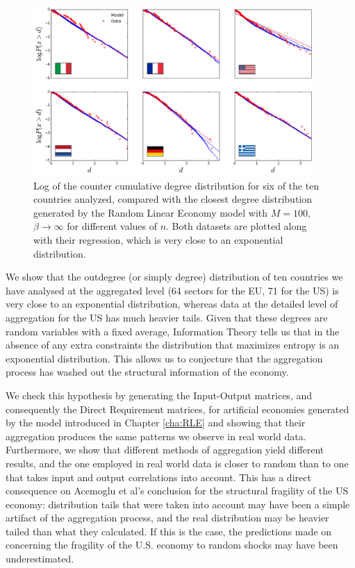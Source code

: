 \begin{figure}[!ht]
  \centering
  \includegraphics[width=0.95\textwidth]{figs_io/6panel_intro.png}
  \caption{Log of the counter cumulative degree distribution for six of the ten countries analyzed, compared with the closest degree distribution generated by the Random Linear Economy model with $M=100$, $\beta \to \infty$ for different values of $n$. Both datasets are plotted along with their regression, which is very close to an exponential distribution.}
  \label{fig:intro_io}
\end{figure}

We show that the outdegree (or simply degree) distribution of ten countries we have analysed at the aggregated level (64 sectors for the EU, 71 for the US) is very close to an exponential distribution, whereas data at the detailed level of aggregation for the US has much heavier tails. Given that these degrees are random variables with a fixed average, Information Theory tells us that in the absence of any extra constraints the distribution that maximizes entropy is an exponential distribution. This allows us to conjecture that the aggregation process has washed out the structural information of the economy.

We check this hypothesis by generating the Input-Output matrices, and consequently the Direct Requirement matrices, for artificial economies generated by the model introduced in Chapter \ref{cha:RLE} and showing that their aggregation produces the same patterns we observe in real world data. Furthermore, we show that different methods of aggregation yield different results, and the one employed in real world data is closer to random than to one that takes input and output correlations into account. This has a direct consequence on Acemoglu et al's conclusion for the structural fragility of the US economy: distribution tails that were taken into account may have been a simple artifact of the aggregation process, and the real distribution may be heavier tailed than what they calculated. If this is the case, the predictions made on \cite{Acemoglu12} concerning the fragility of the U.S. economy to random shocks may have been underestimated.

